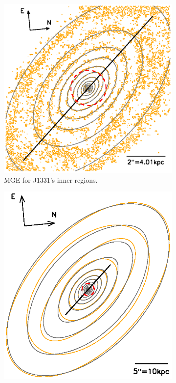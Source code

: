 \documentclass[useAMS,usenatbib]{mnras}
\begin{document}
\begin{figure}
\centering
\begin{subfigure}{.5\textwidth}
  \centering
  \includegraphics[width=.8\columnwidth]{fig/1331F814Wsci_MGE_M.ps}
  \caption{MGE for J1331's inner regions.}
 \label{fig:MGEinnerRegions}
\end{subfigure}%
\begin{subfigure}{.5\textwidth}
  \centering
  \includegraphics[width=.8\columnwidth]{fig/1331F814W_MGE_disk_L.ps}

\end{subfigure}
\end{figure}
\end{document}
